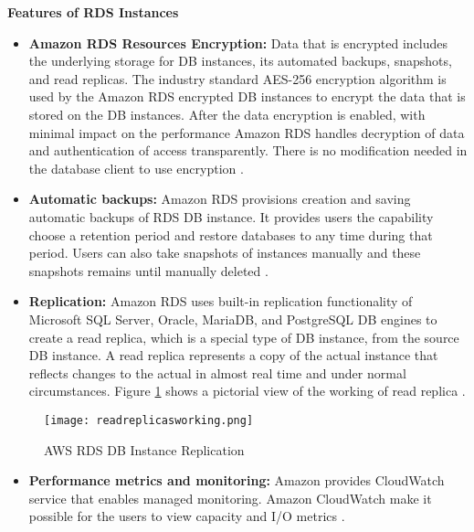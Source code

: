\textbf{Features of RDS Instances}
\begin{itemize}
    \item \textbf{Amazon RDS Resources Encryption:} Data that is encrypted includes the underlying storage for DB instances, its automated backups, snapshots, and read replicas.
    The industry standard AES-256 encryption algorithm is used by the Amazon RDS encrypted DB instances to encrypt the data that is stored on the DB instances.
    After the data encryption is enabled, with minimal impact on the performance Amazon RDS handles decryption of data and authentication of access transparently.
    There is no modification needed in the database client to use encryption \cite{37}.
\end{itemize}
\begin{itemize}
    \item \textbf{Automatic backups:} Amazon RDS provisions creation and saving automatic backups of RDS DB instance.
    It
    provides users the capability choose a retention period and restore databases to any time during that period.
    Users can also take snapshots of instances manually and these snapshots remains until manually deleted \cite{37}.
\end{itemize}
\begin{itemize}
    \item \textbf{Replication:} Amazon RDS uses built-in
    replication functionality of Microsoft SQL Server, Oracle, MariaDB, and PostgreSQL DB engines to create a read replica, which is a special type of DB instance, from the source DB instance.
    A read replica represents a copy of the actual instance that reflects changes to the actual in almost real time and under normal circumstances.
    Figure \ref{fig:readreplicasworking} shows a pictorial view of the working of read replica \cite{37}.
\end{itemize}
\begin{figure}
    \centering
    \texttt{[image: readreplicasworking.png]}
    \caption{AWS RDS DB Instance Replication}{\cite{38}}
    \label{fig:readreplicasworking}
\end{figure}
\begin{itemize}
    \item \textbf{Performance metrics and monitoring:} Amazon provides CloudWatch service that enables managed
    monitoring.
    Amazon CloudWatch make it possible for the users to
    view capacity and I/O metrics \cite{37}.
\end{itemize}



